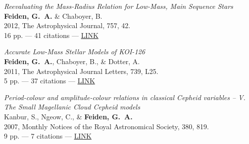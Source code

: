 \documentclass[12pt,letter]{article}
\begin{document}
\begin{etaremune}[leftmargin=0.30in]
    \item {\it Reevaluating the Mass-Radius Relation for Low-Mass, Main Sequence Stars} \\
          {\bf Feiden, G.~A.} \& Chaboyer, B. \\ 
          2012, The Astrophysical Journal, 757, 42. \\
          16 pp. --- 41 citations --- \href{http://adsabs.harvard.edu/abs/2012ApJ...757...42F}{LINK}
    
    \item {\it Accurate Low-Mass Stellar Models of KOI-126} \\
          {\bf Feiden, G.~A.}, Chaboyer, B., \& Dotter, A. \\
          2011, The Astrophysical Journal Letters, 739, L25. \\
          5 pp. --- 37 citations --- \href{http://adsabs.harvard.edu/abs/2011ApJ...740L..25F}{LINK}
          
    \item {\it Period-colour and amplitude-colour relations in classical Cepheid variables -- V. The Small Magellanic Cloud Cepheid models} \\
          Kanbur, S., Ngeow, C., \& {\bf Feiden, G.~A.} \\
          2007, Monthly Notices of the Royal Astronomical Society, 380, 819. \\ 
          9 pp. --- 7 citations --- \href{http://adsabs.harvard.edu/abs/2007MNRAS.380..819K}{LINK}

\end{etaremune}

\vspace{\baselineskip}

\end{document}
